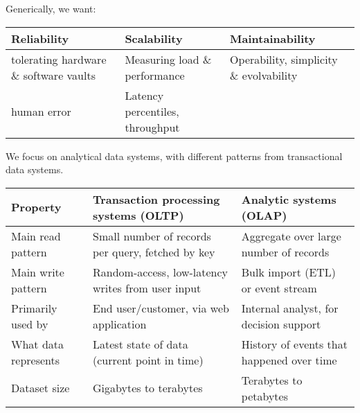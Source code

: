 \documentclass[
  letterpaper,
  DIV=11,
  numbers=noendperiod]{scrartcl}
\begin{document}
Generically, we want:

\begin{longtable}[]{@{}
  >{\raggedright\arraybackslash}p{}
  >{\raggedright\arraybackslash}p{}
  >{\raggedright\arraybackslash}p{}@{}}
\toprule\noalign{}
\begin{minipage}[b]{\linewidth}\raggedright
Reliability
\end{minipage} & \begin{minipage}[b]{\linewidth}\raggedright
Scalability
\end{minipage} & \begin{minipage}[b]{\linewidth}\raggedright
Maintainability
\end{minipage} \\
\midrule\noalign{}
\endhead
\bottomrule\noalign{}
\endlastfoot
tolerating hardware \& software vaults & Measuring load \& performance &
Operability, simplicity \& evolvability \\
human error & Latency percentiles, throughput & \\
\end{longtable}

We focus on analytical data systems, with different patterns from
transactional data systems.

\begin{longtable}[]{@{}
  >{\raggedright\arraybackslash}p{}
  >{\raggedright\arraybackslash}p{}
  >{\raggedright\arraybackslash}p{}@{}}
\toprule\noalign{}
\begin{minipage}[b]{\linewidth}\raggedright
Property
\end{minipage} & \begin{minipage}[b]{\linewidth}\raggedright
Transaction processing systems (OLTP)
\end{minipage} & \begin{minipage}[b]{\linewidth}\raggedright
Analytic systems (OLAP)
\end{minipage} \\
\midrule\noalign{}
\endhead
\bottomrule\noalign{}
\endlastfoot
Main read pattern & Small number of records per query, fetched by key &
Aggregate over large number of records \\
Main write pattern & Random-access, low-latency writes from user input &
Bulk import (ETL) or event stream \\
Primarily used by & End user/customer, via web application & Internal
analyst, for decision support \\
What data represents & Latest state of data (current point in time) &
History of events that happened over time \\
Dataset size & Gigabytes to terabytes & Terabytes to petabytes \\
\end{longtable}
\end{document}
